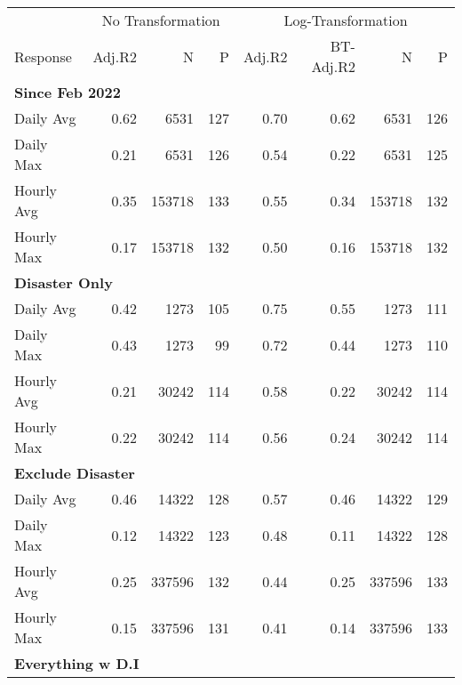 
\begin{tabular}{l|r|r|r|r|r|r|r}
\hline
\multicolumn{1}{c|}{ } & \multicolumn{3}{c|}{No Transformation} & \multicolumn{4}{c}{Log-Transformation} \\
\cline{2-4} \cline{5-8}
Response & Adj.R2 & N & P & Adj.R2 & BT-Adj.R2 & N & P\\
\hline
\multicolumn{8}{l}{\textbf{Since Feb 2022}}\\
\hline
\hspace{1em}Daily Avg & 0.62 & 6531 & 127 & 0.70 & 0.62 & 6531 & 126\\
\hline
\hspace{1em}Daily Max & 0.21 & 6531 & 126 & 0.54 & 0.22 & 6531 & 125\\
\hline
\hspace{1em}Hourly Avg & 0.35 & 153718 & 133 & 0.55 & 0.34 & 153718 & 132\\
\hline
\hspace{1em}Hourly Max & 0.17 & 153718 & 132 & 0.50 & 0.16 & 153718 & 132\\
\hline
\multicolumn{8}{l}{\textbf{Disaster Only}}\\
\hline
\hspace{1em}Daily Avg & 0.42 & 1273 & 105 & 0.75 & 0.55 & 1273 & 111\\
\hline
\hspace{1em}Daily Max & 0.43 & 1273 & 99 & 0.72 & 0.44 & 1273 & 110\\
\hline
\hspace{1em}Hourly Avg & 0.21 & 30242 & 114 & 0.58 & 0.22 & 30242 & 114\\
\hline
\hspace{1em}Hourly Max & 0.22 & 30242 & 114 & 0.56 & 0.24 & 30242 & 114\\
\hline
\multicolumn{8}{l}{\textbf{Exclude Disaster}}\\
\hline
\hspace{1em}Daily Avg & 0.46 & 14322 & 128 & 0.57 & 0.46 & 14322 & 129\\
\hline
\hspace{1em}Daily Max & 0.12 & 14322 & 123 & 0.48 & 0.11 & 14322 & 128\\
\hline
\hspace{1em}Hourly Avg & 0.25 & 337596 & 132 & 0.44 & 0.25 & 337596 & 133\\
\hline
\hspace{1em}Hourly Max & 0.15 & 337596 & 131 & 0.41 & 0.14 & 337596 & 133\\
\hline
\multicolumn{8}{l}{\textbf{Everything w D.I}}\\

\end{tabular}

